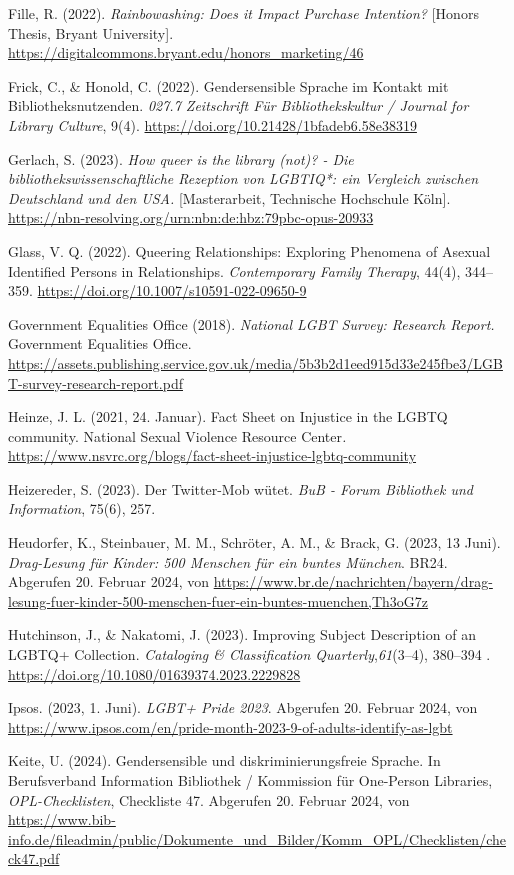 \documentclass[a4paper,
fontsize=11pt,
oneside,
numbers=noperiodatend,
parskip=half-,
bibliography=totoc,
final
]{scrartcl}
\begin{document}
Fille, R. (2022). \emph{Rainbowashing: Does it Impact Purchase
Intention?} {[}Honors Thesis, Bryant University{]}.
\url{https://digitalcommons.bryant.edu/honors_marketing/46}

Frick, C., \& Honold, C. (2022). Gendersensible Sprache im Kontakt mit
Bibliotheksnutzenden. \emph{027.7 Zeitschrift Für Bibliothekskultur /
Journal for Library Culture}, 9(4).
\url{https://doi.org/10.21428/1bfadeb6.58e38319}

Gerlach, S. (2023). \emph{How queer is the library (not)? - Die
bibliothekswissenschaftliche Rezeption von LGBTIQ*: ein Vergleich
zwischen Deutschland und den USA.} {[}Masterarbeit, Technische
Hochschule Köln{]}.
\url{https://nbn-resolving.org/urn:nbn:de:hbz:79pbc-opus-20933}

Glass, V. Q. (2022). Queering Relationships: Exploring Phenomena of
Asexual Identified Persons in Relationships. \emph{Contemporary Family
Therapy}, 44(4), 344--359.
\url{https://doi.org/10.1007/s10591-022-09650-9}

Government Equalities Office (2018). \emph{National LGBT Survey:
Research Report.} Government Equalities Office.
\url{https://assets.publishing.service.gov.uk/media/5b3b2d1eed915d33e245fbe3/LGBT-survey-research-report.pdf}

Heinze, J. L. (2021, 24. Januar). Fact Sheet on Injustice in the LGBTQ
community. National Sexual Violence Resource Center\emph{.}
\url{https://www.nsvrc.org/blogs/fact-sheet-injustice-lgbtq-community}

Heizereder, S. (2023). Der Twitter-Mob wütet. \emph{BuB - Forum
Bibliothek und Information}, 75(6), 257.

Heudorfer, K., Steinbauer, M. M., Schröter, A. M., \& Brack, G. (2023,
13 Juni). \emph{Drag-Lesung für Kinder: 500 Menschen für ein buntes
München}. BR24. Abgerufen 20. Februar 2024, von
\url{https://www.br.de/nachrichten/bayern/drag-lesung-fuer-kinder-500-menschen-fuer-ein-buntes-muenchen,Th3oG7z}

Hutchinson, J., \& Nakatomi, J. (2023). Improving Subject Description of
an LGBTQ+ Collection. \emph{Cataloging \& Classification
Quarterly},\emph{61}(3--4), 380--394 .
\url{https://doi.org/10.1080/01639374.2023.2229828}

Ipsos. (2023, 1. Juni). \emph{LGBT+ Pride 2023}. Abgerufen 20. Februar
2024, von
\url{https://www.ipsos.com/en/pride-month-2023-9-of-adults-identify-as-lgbt}

Keite, U. (2024). Gendersensible und diskriminierungsfreie Sprache. In
Berufsverband Information Bibliothek / Kommission für One-Person
Libraries, \emph{OPL-Checklisten}, Checkliste 47. Abgerufen 20. Februar
2024, von
\url{https://www.bib-info.de/fileadmin/public/Dokumente_und_Bilder/Komm_OPL/Checklisten/check47.pdf}
\end{document}
